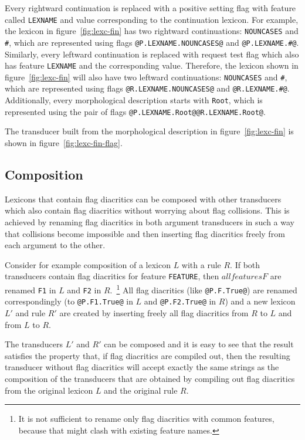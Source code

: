 \documentclass[10pt, a4paper]{article}
\begin{document}
Every rightward continuation is replaced with a positive setting flag
with feature called \texttt{LEXNAME} and value corresponding to the
continuation lexicon. For example, the lexicon in
figure~\ref{fig:lexc-fin} has two rightward continuations:
\texttt{NOUNCASES} and \texttt{\#}, which are represented using flags
\verb+@P.LEXNAME.NOUNCASES@+ and \verb+@P.LEXNAME.#@+.  Similarly,
every leftward continuation is replaced with request test flag which
also has feature \texttt{LEXNAME} and the corresponding
value. Therefore, the lexicon shown in figure~\ref{fig:lexc-fin} will
also have two leftward continuations: \texttt{NOUNCASES} and
\texttt{\#}, which are represented using flags
\verb+@R.LEXNAME.NOUNCASES@+ and \verb+@R.LEXNAME.#@+. Additionally,
every morphological description starts with \texttt{Root}, which is
represented using the pair of flags
\verb+@P.LEXNAME.Root@@R.LEXNAME.Root@+.

The transducer built from the morphological description in
figure~\ref{fig:lexc-fin} is shown in figure~\ref{fig:lexc-fin-flag}.

\subsection{Composition}

Lexicons that contain flag diacritics can be composed with other
transducers which also contain flag diacritics without worrying about
flag collisions. This is achieved by renaming flag diacritics in both
argument transducers in such a way that collisions become impossible
and then inserting flag diacritics freely from each argument to the
other.

Consider for example composition of a lexicon $L$ with a rule $R$. If
both transducers contain flag diacritics for feature {\tt FEATURE},
then $all features F$ are renamed {\tt F1} in $L$ and {\tt F2} in
$R$.~\footnote{It is not sufficient to rename only flag diacritics
  with common features, because that might clash with existing feature
  names.} All flag diacritics (like {\tt @P.F.True@}) are renamed
correspondingly (to {\tt @P.F1.True@} in $L$ and {\tt @P.F2.True@} in
$R$) and a new lexicon $L'$ and rule $R'$ are created by inserting
freely all flag diacritics from $R$ to $L$ and from $L$ to $R$.

The transducers $L'$ and $R'$ can be composed and it is easy to
see that the result satisfies the property that, if flag diacritics
are compiled out, then the resulting transducer without flag
diacritics will accept exactly the same strings as the composition of
the transducers that are obtained by compiling out flag diacritics
from the original lexicon $L$ and the original rule $R$.
\end{document}
